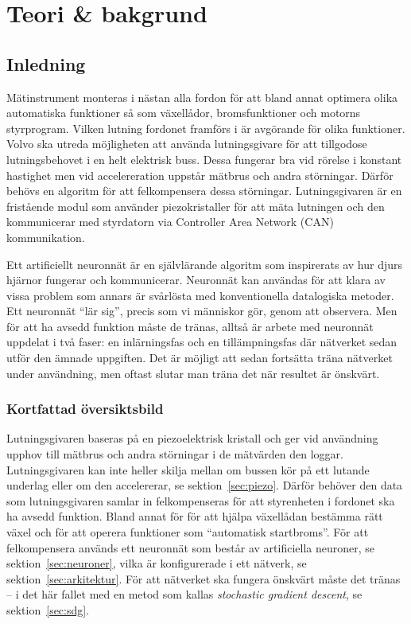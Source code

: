 \section{Teori \& bakgrund}
\subsection{Inledning}
Mätinstrument monteras i nästan alla fordon för att bland annat
optimera olika automatiska funktioner så som växellådor,
bromsfunktioner och motorns styrprogram.
Vilken lutning fordonet framförs i är avgörande för olika funktioner.
Volvo ska utreda möjligheten att använda lutningsgivare för att tillgodose
lutningsbehovet i en helt elektrisk buss.
Dessa fungerar bra vid rörelse i konstant hastighet
men vid accelereration uppstår mätbrus och andra störningar.
Därför behövs en algoritm för att felkompensera dessa störningar.
Lutningsgivaren är en fristående modul som använder piezokristaller för att
mäta lutningen och den kommunicerar med styrdatorn
via Controller Area Network (CAN) kommunikation.

Ett artificiellt neuronnät är en självlärande algoritm som inspirerats av
hur djurs hjärnor fungerar och kommunicerar.
Neuronnät kan användas för att klara av vissa problem som annars är svårlösta
med konventionella datalogiska metoder.
Ett neuronnät ``lär sig'', precis som vi människor gör, genom att observera.
Men för att ha avsedd funktion måste de tränas, alltså är arbete med neuronnät
uppdelat i två faser: en inlärningsfas och en tillämpningsfas där nätverket sedan
utför den ämnade uppgiften.
\autocite{copeland16}
Det är möjligt att sedan fortsätta träna nätverket
under användning, men oftast slutar man träna det när resultet är önskvärt.
\autocite{wiki-neuronnat}

\subsubsection{Kortfattad översiktsbild}
Lutningsgivaren baseras på en piezoelektrisk kristall och ger vid användning
upphov till mätbrus och andra störningar i de mätvärden den loggar.
Lutningsgivaren kan inte heller skilja mellan om bussen kör på ett lutande underlag
eller om den accelererar, se sektion~\ref{sec:piezo}.
Därför behöver den data som lutningsgivaren samlar in felkompenseras för att
styrenheten i fordonet ska ha avsedd funktion. Bland annat för för att hjälpa växellådan
bestämma rätt växel och för att operera funktioner som ``automatisk startbroms''.
För att felkompensera används ett neuronnät som består av artificiella
neuroner, se sektion~\ref{sec:neuroner}, vilka är konfigurerade i ett nätverk,
se sektion~\ref{sec:arkitektur}. För att nätverket ska fungera önskvärt måste
det tränas -- i det här fallet med en metod som kallas \emph{stochastic gradient descent},
se sektion~\ref{sec:sdg}.

